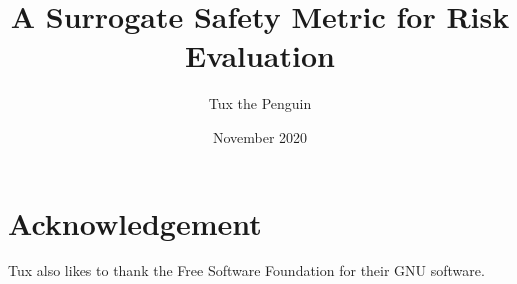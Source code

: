 \documentclass{article}
\title{A Surrogate Safety Metric for Risk Evaluation}
\author{Tux the Penguin}
\date{November 2020}
\begin{document}
\maketitle








\section*{Acknowledgement}

Tux also likes to thank the Free Software Foundation for their GNU software.



\end{document}
